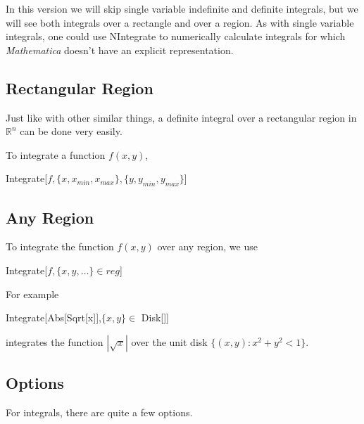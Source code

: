\documentclass[11pt,letterpaper,twoside,titlepage]{book}
\newcommand{\Mathematica}{\textit{Mathematica} }
\begin{document}
				In this version we will skip single variable indefinite and definite integrals, but we will see both integrals over a rectangle and over a region.  As with single variable integrals, one could use NIntegrate to numerically calculate integrals for which \Mathematica doesn't have an explicit representation.
				
				\subsection{Rectangular Region}
				
					Just like with other similar things, a definite integral over a rectangular region in $\mathbb{R}^n$ can be done very easily.  
					
					To integrate a function $f(x,y)$,
					
					\begin{center}

						Integrate[$f, \{x, x_{min}, x_{max} \}, \{y, y_{min}, y_{max} \}$]
					
					\end{center}
					
				\subsection{Any Region}
				
					To integrate the function $f(x,y)$ over any region, we use 
					
					\begin{center}

						Integrate[$f, \{x,y,\ldots\} \in reg$]
					
					\end{center}
					
					For example
					
					\begin{center}
					
						Integrate[Abs[Sqrt[x]],$ \{x,y\} \in $ Disk[]]
					
					\end{center}
					
					integrates the function $|\sqrt{x}|$ over the unit disk $\{(x,y) : x^2 + y^2 < 1\}$.
					
				\subsection{Options}
				
					For integrals, there are quite a few options.  
					
\end{document}
